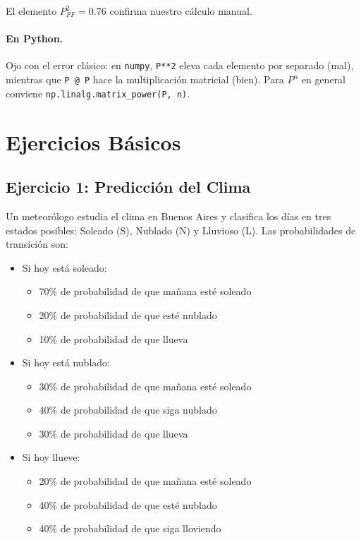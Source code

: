 \documentclass[a4paper,11pt]{article}
\begin{document}
El elemento $P^2_{FF} = 0.76$ confirma nuestro cálculo manual.

\paragraph{En Python.} Ojo con el error clásico: en \texttt{numpy}, \texttt{P**2} eleva cada elemento por separado (mal), mientras que \texttt{P @ P} hace la multiplicación matricial (bien). Para $P^n$ en general conviene \texttt{np.linalg.matrix\_power(P, n)}.

\section{Ejercicios Básicos}

\subsection{Ejercicio 1: Predicción del Clima}

Un meteorólogo estudia el clima en Buenos Aires y clasifica los días en tres estados posibles: Soleado (S), Nublado (N) y Lluvioso (L). Las probabilidades de transición son:

\begin{itemize}
    \item Si hoy está soleado:
        \begin{itemize}
            \item 70\% de probabilidad de que mañana esté soleado
            \item 20\% de probabilidad de que esté nublado
            \item 10\% de probabilidad de que llueva
        \end{itemize}
    \item Si hoy está nublado:
        \begin{itemize}
            \item 30\% de probabilidad de que mañana esté soleado
            \item 40\% de probabilidad de que siga nublado
            \item 30\% de probabilidad de que llueva
        \end{itemize}
    \item Si hoy llueve:
        \begin{itemize}
            \item 20\% de probabilidad de que mañana esté soleado
            \item 40\% de probabilidad de que esté nublado
            \item 40\% de probabilidad de que siga lloviendo
        \end{itemize}
\end{itemize}
\end{document}
